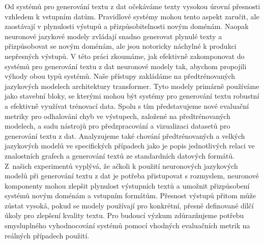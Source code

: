 Od systémů pro generování textu z dat očekáváme texty vysokou úrovní přesnosti vzhledem k vstupním datům. Pravidlové systémy mohou tento aspekt zaručit, ale zaostávají v plynulosti výstupů a přizpůsobitelnosti novým doménám. Naopak neuronové jazykové modely zvládají snadno generovat plynulé texty a přizpůsobovat se novým doménám, ale jsou notoricky náchylné k produkci nepřesných výstupů. V této práci zkoumáme, jak efektivně zakomponovat do systémů pro generování textu z dat neuronové modely tak, abychom propojili výhody obou typů systémů. Naše přístupy zakládáme na předtrénovaných jazykových modelech architektury transformer. Tyto modely primárně používáme jako stavební bloky, se kterými mohou být systémy pro generování textu robustní a efektivně využívat trénovací data. Spolu s tím představujeme nové evaluační metriky pro odhalování chyb ve výstupech, založené na předtrénovaných modelech, a sadu nástrojů pro předzpracování a vizualizaci datasetů pro generování textu z dat. Analyzujeme také chování předtrénovaných a velkých jazykových modelů ve specifických případech jako je popis jednotlivých relaci ve znalostních grafech a generování textů ze standardních datových formátů. Z~našich experimentů vyplývá, že ačkoli k použití neuronových jazykových modelů při generování textu z dat je potřeba přistupovat s rozmyslem, neuronové komponenty mohou zlepšit plynulost výstupních textů a umožnit přizpůsobení systémů novým doménám a vstupním formátům. Přesnost výstupů přitom může zůstat vysoká, pokud se modely používají pro konkrétní, přesně definované dílčí úkoly pro zlepšení kvality textu. Pro budoucí výzkum zdůrazňujeme potřebu smysluplného vyhodnocování systémů pomocí vhodných evaluačních metrik na reálných případech použití.